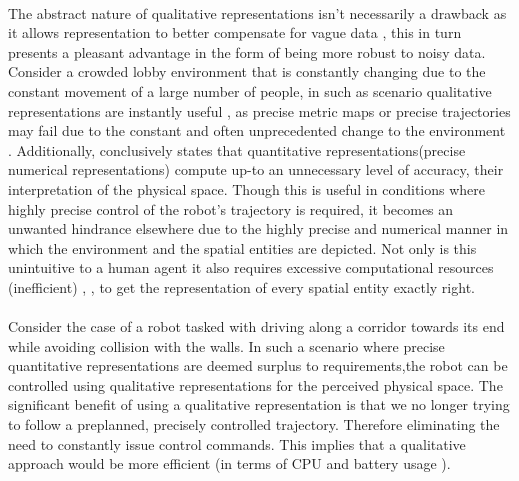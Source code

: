\paragraph{}The abstract nature of qualitative representations isn't necessarily a drawback as it allows representation to better compensate for vague data \cite{musto1999qualitative}, this in turn presents a pleasant advantage in the form of being more robust to noisy data. Consider a crowded lobby environment that is constantly changing due to the constant movement of a large number of people, in such as scenario qualitative representations are instantly useful \cite{fraser2004application}, as precise metric maps or precise trajectories may fail due to the constant and often unprecedented change to the environment \cite{shah2013qualitative}. Additionally, \cite{musto1999qualitative} conclusively states that quantitative representations(precise numerical representations) compute up-to an unnecessary level of accuracy, their interpretation of the physical space. Though this is useful in conditions where highly precise control of the robot's trajectory is required, it becomes an unwanted hindrance elsewhere due to the highly precise and numerical manner in which the environment and the spatial entities are depicted. Not only is this unintuitive to a human agent it also requires excessive computational resources (inefficient) \cite{musto1999qualitative}, \cite{blackwell1988spatial},  \cite{shah2013qualitative}to get the representation of every spatial entity exactly right. 

\paragraph{} Consider the case of a robot tasked with driving along a corridor towards its end while avoiding collision with the walls. In such a scenario where precise quantitative representations are deemed surplus to requirements,the robot  can be controlled using qualitative representations for the perceived physical space. The significant benefit of using a qualitative representation is that we no longer trying to follow a preplanned, precisely controlled trajectory. Therefore eliminating the need to constantly issue control commands. This implies that a qualitative approach would be more efficient \cite{chen2015survey} (in terms of CPU and battery usage \cite{wakita1995intelligent}).

